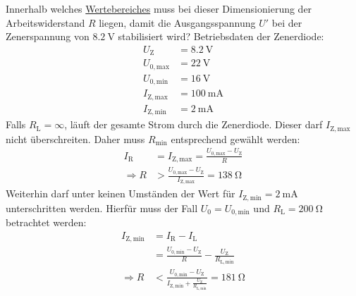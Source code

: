 \documentclass{article}
\theoremstyle{definition}
\begin{document}
\begin{voraufgabe}{Innerhalb welches \underline{Wertebereiches} muss bei dieser Dimensionierung der Arbeitswiderstand $R$ liegen, damit die Ausgangsspannung $U'$ bei der Zenerspannung von $\SI{8.2}{\volt}$ stabilisiert wird?}
    Betriebsdaten der Zenerdiode:
    \begin{align*}
        U_\mathrm{Z}&=\SI{8.2}{\volt}\\
        U_\mathrm{0,max}&=\SI{22}{\volt}\\
        U_\mathrm{0,min}&=\SI{16}{\volt}\\
        I_\mathrm{Z,max}&=\SI{100}{\milli\ampere}\\
        I_\mathrm{Z,min}&=\SI{2}{\milli\ampere}
    \end{align*}
    Falls $R_\mathrm{L}=\infty$, läuft der gesamte Strom durch die Zenerdiode. Dieser darf $I_\mathrm{Z,max}$ nicht überschreiten. Daher muss $R_\mathrm{min}$ entsprechend gewählt werden:
    \begin{align*}
        I_\mathrm{R}&=I_\mathrm{Z,max}=\frac{U_\mathrm{0,max}-U_\mathrm{Z}}{R}\\
        \Rightarrow R&>\frac{U_\mathrm{0,max}-U_\mathrm{Z}}{I_\mathrm{Z,max}}=\SI{138}{\ohm}
    \end{align*}
    Weiterhin darf unter keinen Umständen der Wert für $I_\mathrm{Z,min}=\SI{2}{\milli\ampere}$ unterschritten werden. Hierfür muss der Fall $U_0=U_\mathrm{0,min}$ und $R_\mathrm{L}=\SI{200}{\ohm}$ betrachtet werden:
    \begin{align*}
        I_\mathrm{Z,min} &= I_\mathrm{R}-I_\mathrm{L} \\
        &= \frac{U_\mathrm{0,min}-U_\mathrm{Z}}{R}-\frac{U_\mathrm{Z}}{R_\mathrm{L,min}} \\
        \Rightarrow R &< \frac{U_\mathrm{0,min}-U_\mathrm{Z}}{I_\mathrm{Z,min}+\frac{U_\mathrm{Z}}{R_\mathrm{L,min}}} = \SI{181}{\ohm}
    \end{align*}    
\end{voraufgabe}


\clearpage
\end{document}
